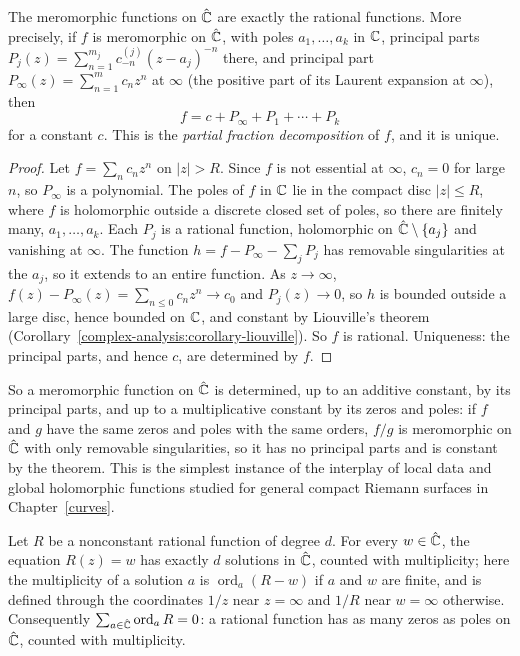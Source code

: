 \begin{theorem}\label{complex-analysis:theorem-rational}
The meromorphic functions on $\hat{\mathbb{C}}$ are exactly the rational functions. More precisely, if $f$ is meromorphic on $\hat{\mathbb{C}}$, with poles $a_1, \ldots, a_k$ in $\mathbb{C}$, principal parts $P_j(z) = \sum_{n=1}^{m_j}c^{(j)}_{-n}(z - a_j)^{-n}$ there,
and principal part $P_\infty(z) = \sum_{n=1}^mc_nz^n$ at $\infty$ (the positive part of its Laurent expansion at $\infty$), then
\[
f = c + P_\infty + P_1 + \cdots + P_k
\]
for a constant $c$. This is the \emph{partial fraction decomposition} of $f$, and it is unique.
\end{theorem}

\begin{proof}
Let $f = \sum_nc_nz^n$ on $|z| > R$. Since $f$ is not essential at $\infty$, $c_n = 0$ for large $n$, so $P_\infty$ is a polynomial. The poles of $f$ in $\mathbb{C}$ lie in the compact disc $|z| \leq R$, where $f$ is
holomorphic outside a discrete closed set of poles, so there are finitely many, $a_1, \ldots, a_k$. Each $P_j$ is a rational function, holomorphic on $\hat{\mathbb{C}} \setminus \{a_j\}$ and vanishing at $\infty$. The function
$h = f - P_\infty - \sum_jP_j$ has removable singularities at the $a_j$, so it extends to an entire function. As $z \to \infty$, $f(z) - P_\infty(z) = \sum_{n \leq 0}c_nz^n \to c_0$ and $P_j(z) \to 0$, so $h$ is bounded
outside a large disc, hence bounded on $\mathbb{C}$, and constant by Liouville's theorem (Corollary~\ref{complex-analysis:corollary-liouville}). So $f$ is rational. Uniqueness: the principal parts, and hence $c$,
are determined by $f$.
\end{proof}

So a meromorphic function on $\hat{\mathbb{C}}$ is determined, up to an additive constant, by its principal parts, and up to a multiplicative constant by its zeros and poles: if $f$ and $g$ have the same zeros and
poles with the same orders, $f/g$ is meromorphic on $\hat{\mathbb{C}}$ with only removable singularities, so it has no principal parts and is constant by the theorem. This is the simplest instance of the
interplay of local data and global holomorphic functions studied for general compact Riemann surfaces in Chapter~\ref{curves}.

\begin{proposition}\label{complex-analysis:proposition-rational-degree}
Let $R$ be a nonconstant rational function of degree $d$. For every $w \in \hat{\mathbb{C}}$, the equation $R(z) = w$ has exactly $d$ solutions in $\hat{\mathbb{C}}$, counted with multiplicity; here the multiplicity of a solution
$a$ is $\operatorname{ord}_a(R - w)$ if $a$ and $w$ are finite, and is defined through the coordinates $1/z$ near $z = \infty$ and $1/R$ near $w = \infty$ otherwise. Consequently
$\sum_{a \in \hat{\mathbb{C}}}\operatorname{ord}_aR = 0$: a rational function has as many zeros as poles on $\hat{\mathbb{C}}$, counted with multiplicity.
\end{proposition}

